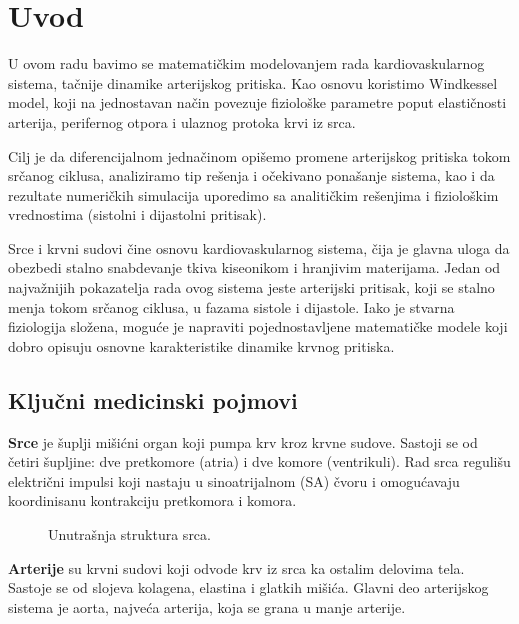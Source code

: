 \documentclass[12pt,a4paper]{article}
\begin{document}
\section{Uvod}

U ovom radu bavimo se matematičkim modelovanjem rada kardiovaskularnog sistema, tačnije dinamike arterijskog pritiska. Kao osnovu koristimo Windkessel model, koji na jednostavan način povezuje fiziološke parametre poput elastičnosti arterija, perifernog otpora i ulaznog protoka krvi iz srca.

Cilj je da diferencijalnom jednačinom opišemo promene arterijskog pritiska tokom srčanog ciklusa, analiziramo tip rešenja i očekivano ponašanje sistema, kao i da rezultate numeričkih simulacija uporedimo sa analitičkim rešenjima i fiziološkim vrednostima (sistolni i dijastolni pritisak).

Srce i krvni sudovi čine osnovu kardiovaskularnog sistema, čija je glavna uloga da obezbedi stalno snabdevanje tkiva kiseonikom i hranjivim materijama. Jedan od najvažnijih pokazatelja rada ovog sistema jeste arterijski pritisak, koji se stalno menja tokom srčanog ciklusa, u fazama sistole i dijastole. Iako je stvarna fiziologija složena, moguće je napraviti pojednostavljene matematičke modele koji dobro opisuju osnovne karakteristike dinamike krvnog pritiska.

\subsection{Ključni medicinski pojmovi}

\textbf{Srce} je šuplji mišićni organ koji pumpa krv kroz krvne sudove. Sastoji se od četiri šupljine: dve pretkomore (atria) i dve komore (ventrikuli). Rad srca regulišu električni impulsi koji nastaju u sinoatrijalnom (SA) čvoru i omogućavaju koordinisanu kontrakciju pretkomora i komora.

\begin{figure}[H]
    \centering
    \caption{Unutrašnja struktura srca.}
    \label{fig:srce}
\end{figure}

\textbf{Arterije} su krvni sudovi koji odvode krv iz srca ka ostalim delovima tela. Sastoje se od slojeva kolagena, elastina i glatkih mišića. Glavni deo arterijskog sistema je aorta, najveća arterija, koja se grana u manje arterije.
\end{document}
